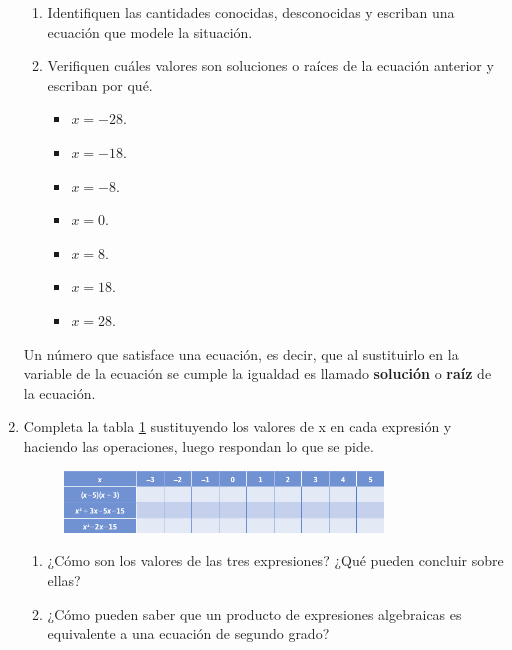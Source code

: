 \documentclass[11pt]{book}
\begin{document}
\begin{enumerate}
          \begin{enumerate}
              \item Identifiquen las cantidades conocidas, desconocidas y escriban una ecuación que
                    modele la situación.
              \item Verifiquen cuáles valores son soluciones o raíces de la ecuación anterior y escriban
                    por qué.
                    \begin{itemize}
                        \item $x = -28$.
                        \item $x = -18$.
                        \item $x = -8$.
                        \item $x = 0$.
                        \item $x = 8$.
                        \item $x = 18$.
                        \item $x = 28$.
                    \end{itemize}

          \end{enumerate}
          \begin{boxH}
              Un número que satisface una ecuación, es decir, que al sustituirlo en la variable de
              la ecuación se cumple la igualdad es llamado \textbf{solución} o \textbf{raíz} de la ecuación.
          \end{boxH}

          \newpage

    \item Completa la tabla \ref{tab:table01} sustituyendo los valores de x en cada expresión y haciendo las operaciones, luego respondan lo que se pide.

          \begin{figure}[H]
              \centering
              \includegraphics[width=0.8\textwidth]{tabla01.png}
              \label{tab:table01}
          \end{figure}

          \begin{enumerate}
              \item ¿Cómo son los valores de las tres expresiones? ¿Qué pueden concluir sobre ellas?
              \item ¿Cómo pueden saber que un producto de expresiones algebraicas es equivalente a una ecuación de segundo grado?
          \end{enumerate}



\end{enumerate}
\end{document}
